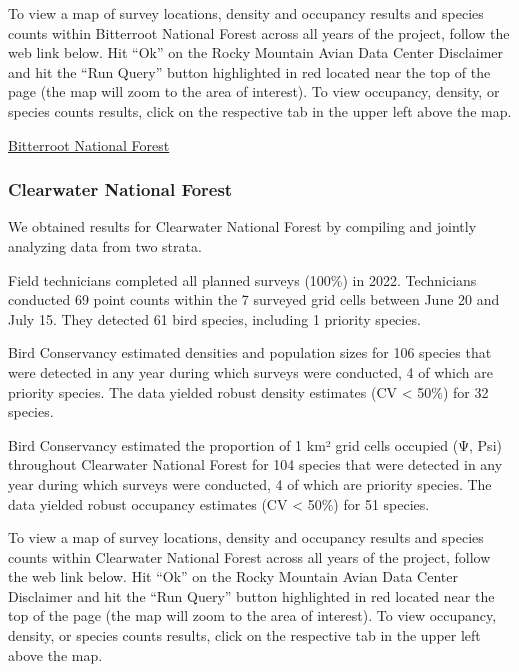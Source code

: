 \documentclass[
  letterpaper,
  DIV=11,
  numbers=noendperiod,
  oneside]{scrreprt}
\begin{document}
To view a map of survey locations, density and occupancy results and
species counts within Bitterroot National Forest across all years of the
project, follow the web link below. Hit ``Ok'' on the Rocky Mountain
Avian Data Center Disclaimer and hit the ``Run Query'' button
highlighted in red located near the top of the page (the map will zoom
to the area of interest). To view occupancy, density, or species counts
results, click on the respective tab in the upper left above the map.

\href{http://www.rmbo.org/new_site/adc/QueryWindow.aspx\#N4IgzgrgDgpgTmALnAhoiBbEAuABCAIQEtFF44B7CxXAOTSIoDsUAbXAMQrhiRAF8gA=}{Bitterroot
National Forest}

\hypertarget{clearwater-national-forest}{%
\subsubsection{Clearwater National
Forest}\label{clearwater-national-forest}}

We obtained results for Clearwater National Forest by compiling and
jointly analyzing data from two strata.

Field technicians completed all planned surveys (100\%) in 2022.
Technicians conducted 69 point counts within the 7 surveyed grid cells
between June 20 and July 15. They detected 61 bird species, including 1
priority species.

Bird Conservancy estimated densities and population sizes for 106
species that were detected in any year during which surveys were
conducted, 4 of which are priority species. The data yielded robust
density estimates (CV \textless{} 50\%) for 32 species.

Bird Conservancy estimated the proportion of 1 km² grid cells occupied
(Ψ, Psi) throughout Clearwater National Forest for 104 species that were
detected in any year during which surveys were conducted, 4 of which are
priority species. The data yielded robust occupancy estimates (CV
\textless{} 50\%) for 51 species.

To view a map of survey locations, density and occupancy results and
species counts within Clearwater National Forest across all years of the
project, follow the web link below. Hit ``Ok'' on the Rocky Mountain
Avian Data Center Disclaimer and hit the ``Run Query'' button
highlighted in red located near the top of the page (the map will zoom
to the area of interest). To view occupancy, density, or species counts
results, click on the respective tab in the upper left above the map.
\end{document}
